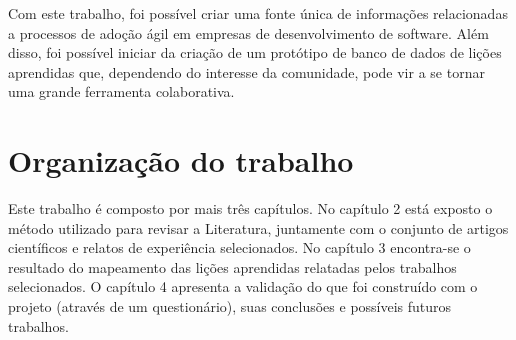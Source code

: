 Com este trabalho, foi possível criar uma fonte única de informações relacionadas a processos de adoção ágil em empresas de desenvolvimento de software. Além disso, foi possível iniciar da criação de um protótipo de banco de dados de lições aprendidas que, dependendo do interesse da comunidade, pode vir a se tornar uma grande ferramenta colaborativa.

\section{Organização do trabalho}

Este trabalho é composto por mais três capítulos. No capítulo 2 está exposto o método utilizado para revisar a Literatura, juntamente com o conjunto de artigos científicos e relatos de experiência selecionados. No capítulo 3 encontra-se o resultado do mapeamento das lições aprendidas relatadas pelos trabalhos selecionados. O capítulo 4 apresenta a validação do que foi construído com o projeto (através de um questionário), suas conclusões e possíveis futuros trabalhos.
